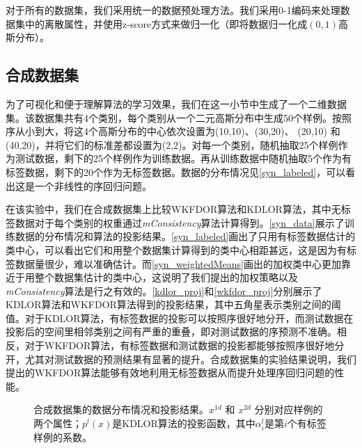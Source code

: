 对于所有的数据集，我们采用统一的数据预处理方法。我们采用0-1编码来处理数据集中的离散属性，并使用z-score方式来做归一化（即将数据归一化成\((0,1)\)高斯分布）。

\subsection{合成数据集}
为了可视化和便于理解算法的学习效果，我们在这一小节中生成了一个二维数据集。该数据集共有4个类别，每个类别从一个二元高斯分布中生成50个样例。按照序从小到大，将这4个高斯分布的中心依次设置为(10,10)、(30,20)、 (20,10) 和(40,20)，并将它们的标准差都设置为(2,2)。对每一个类别，随机抽取25个样例作为测试数据，剩下的25个样例作为训练数据。再从训练数据中随机抽取5个作为有标签数据，剩下的20个作为无标签数据。数据的分布情况见\autoref{syn_labeled}，可以看出这是一个非线性的序回归问题。

在该实验中，我们在合成数据集上比较WKFDOR算法和KDLOR算法，其中无标签数据对于每个类别的权重通过\textit{mConsistency}算法计算得到。\autoref{syn_data}展示了训练数据的分布情况和算法的投影结果。\autoref{syn_labeled}画出了只用有标签数据估计的类中心，可以看出它们和用整个数据集计算得到的类中心相距甚远，这是因为有标签数据量很少，难以准确估计。而\autoref{syn_weightedMeans}画出的加权类中心更加靠近于用整个数据集估计的类中心，这说明了我们提出的加权策略以及 \textit{mConsistency}算法是行之有效的。\autoref{kdlor_proj}和\autoref{wkfdor_proj}分别展示了KDLOR算法和WKFDOR算法得到的投影结果，其中五角星表示类别之间的阈值。对于KDLOR算法，有标签数据的投影可以按照序很好地分开，而测试数据在投影后的空间里相邻类别之间有严重的重叠，即对测试数据的序预测不准确。相反，对于WKFDOR算法，有标签数据和测试数据的投影都能够按照序很好地分开，尤其对测试数据的预测结果有显著的提升。合成数据集的实验结果说明，我们提出的WKFDOR算法能够有效地利用无标签数据从而提升处理序回归问题的性能。

\begin{figure*}[!htb]
{
\hfil
{}
\hfil
{}
\hfil
{}}
\caption{合成数据集的数据分布情况和投影结果。$x^{1d}$ 和 $x^{2d}$ 分别对应样例的两个属性；$p^{l}(x)$是KDLOR算法的投影函数，其中$\alpha_{i}^{l}$是第$i$个有标签样例的系数。}
\label{syn_data}
\end{figure*}

